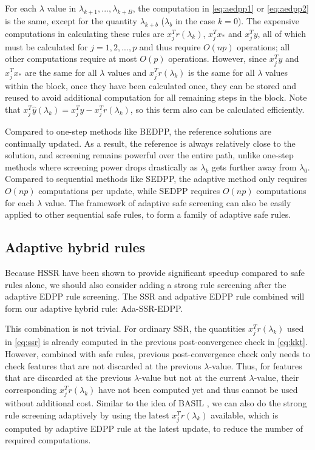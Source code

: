 For each $\lambda$ value in $\lambda_{k+1},...,\lambda_{k+B}$, the computation in \eqref{eq:aedpp1} or \eqref{eq:aedpp2} is the same, except for the quantity $\lambda_{k+b}$ ($\lambda_b$ in the case $k=0$). The expensive computations in calculating these rules are $x_j^Tr(\lambda_k)$, $x_j^Tx_*$ and $x_j^Ty$, all of which must be calculated for $j=1,2,...,p$ and thus require $O(np)$ operations; all other computations require at most $O(p)$ operations. However, since $x_j^Ty$ and $x_j^Tx_*$ are the same for all $\lambda$ values and $x_j^Tr(\lambda_k)$ is the same for all $\lambda$ values within the block, once they have been calculated once, they can be stored and reused to avoid additional computation for all remaining steps in the block.  Note that $x_j^T\hat{y}(\lambda_k)=x_j^Ty-x_j^Tr(\lambda_k)$, so this term also can be calculated efficiently.

Compared to one-step methods like BEDPP, the reference solutions are continually updated.  As a result, the reference is always relatively close to the solution, and screening remains powerful over the entire path, unlike one-step methods where screening power drops drastically as $\lambda_k$ gets further away from $\lambda_0$. Compared to sequential methods like SEDPP, the adaptive method only requires $O(np)$ computations per update, while SEDPP requires $O(np)$ computations for each $\lambda$ value. The framework of adaptive safe screening can also be easily applied to other sequential safe rules, to form a family of adaptive safe rules.

\subsection{Adaptive hybrid rules}

Because HSSR \citep{Zeng2021} have been shown to provide significant speedup compared to safe rules alone, we should also consider adding a strong rule screening after the adaptive EDPP rule screening. The SSR and adpative EDPP rule combined will form our adaptive hybrid rule: Ada-SSR-EDPP.

This combination is not trivial. For ordinary SSR, the quantities $x_j^Tr(\lambda_k)$ used in \eqref{eq:ssr} is already computed in the previous post-convergence check in \eqref{eq:kkt}. However, combined with safe rules, previous post-convergence check only needs to check features that are not discarded at the previous $\lambda$-value. Thus, for features that are discarded at the previous $\lambda$-value but not at the current $\lambda$-value, their corresponding $x_j^Tr(\lambda_k)$ have not been computed yet and thus cannot be used without additional cost. Similar to the idea of BASIL \citep{qian2019fast}, we can also do the strong rule screening adaptively by using the latest $x_j^Tr(\lambda_k)$ available, which is computed by adaptive EDPP rule at the latest update, to reduce the number of required computations.


